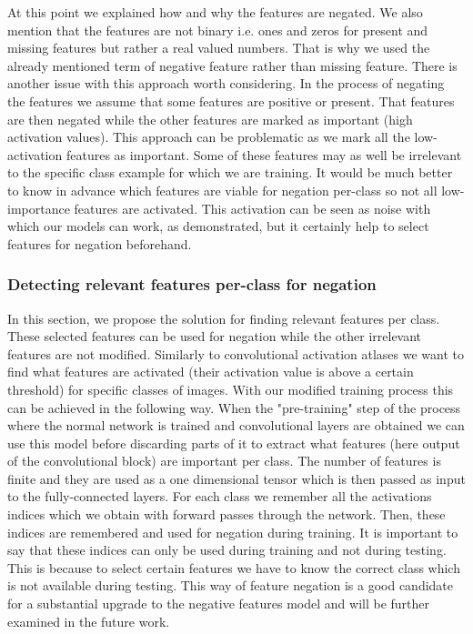 \documentclass[b5paper]{book}
\begin{document}
At this point we explained how and why the features are negated. We also mention that the features are not binary i.e. ones and zeros for present and missing features but rather a real valued numbers. That is why we used the already mentioned term of negative feature rather than missing feature. There is another issue with this approach worth considering. In the process of negating the features we assume that some features are positive or present. That features are then negated while the other features are marked as important (high activation values). This approach can be problematic as we mark all the low-activation features as important. Some of these features may as well be irrelevant to the specific class example for which we are training. It would be much better to know in advance which features are viable for negation per-class so not all low-importance features are activated. This activation can be seen as noise with which our models can work, as demonstrated, but it certainly help to select features for negation beforehand.  

\subsubsection{Detecting relevant features per-class for negation}

In this section, we propose the solution for finding relevant features per class. These selected features can be used for negation while the other irrelevant features are not modified. Similarly to convolutional activation atlases we want to find what features are activated (their activation value is above a certain threshold) for specific classes of images. With our modified training process this can be achieved in the following way. When the "pre-training" step of the process where the normal network is trained and convolutional layers are obtained we can use this model before discarding parts of it to extract what features (here output of the convolutional block) are important per class. The number of features is finite and they are used as a one dimensional tensor which is then passed as input to the fully-connected layers. For each class we remember all the activations indices which we obtain with forward passes through the network. Then, these indices are remembered and used for negation during training. It is important to say that these indices can only be used during training and not during testing. This is because to select certain features we have to know the correct class which is not available during testing. This way of feature negation is a good candidate for a substantial upgrade to the negative features model and will be further examined in the future work.
\end{document}
